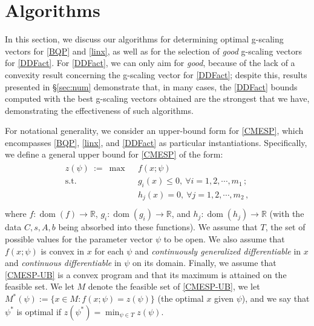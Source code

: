 \documentclass[smallextended]{svjour3hack}       %
\newcommand{\jon}[1]{\noindent{\color{cyan}[Jon:]\ {#1}}}
\newcommand{\zc}[1]{\noindent{\color{red}[Zhongzhu:]\ {#1}}}
\DeclareMathOperator{\dom}{dom}
\begin{document}
\section{Algorithms}
In this section, we discuss our algorithms  for determining optimal g-scaling vectors for \ref{BQP} and \ref{linx}, as well as for the selection of \emph{good} g-scaling vectors for \ref{DDFact}.
For \ref{DDFact}, we can only aim for \emph{good}, because of the lack of a convexity result concerning the g-scaling vector for \ref{DDFact}; despite this, results presented in \S \ref{sec:num} demonstrate that, in many cases, the \ref{DDFact} bounds computed with the best g-scaling vectors obtained are the strongest that we have, demonstrating the effectiveness of such algorithms.

For notational generality, we consider an upper-bound form for \ref{CMESP}, which encompasses \ref{BQP}, \ref{linx}, and \ref{DDFact} as particular instantiations. Specifically, we define a general upper bound for \ref{CMESP} of the form:
\begin{align}\tag{CMESP-UB} \label{CMESP-UB}
    \begin{array}{rl}
         z(\psi)~:=~ \max ~& ~f(x; \psi) \\
         \text{s.t.} ~& ~ g_i(x) \le 0, ~ \forall i = 1, 2, \cdots, m_1\,;\\
         &~ h_j(x) = 0, ~ \forall j = 1, 2, \cdots, m_2\,,\\
    \end{array}
\end{align}
where  $f: \dom(f) \rightarrow \mathbb{R}$,
$g_i:\dom(g_i) \rightarrow \mathbb{R}$, and $h_j:\dom(h_j)\rightarrow \mathbb{R}$ (with the data  $C,s, A, b$ being absorbed into these functions). We assume that $T$, the set of possible values for the parameter vector $\psi$ to be open. We also assume that $f(x;\psi)$ is convex in $x$ for each $\psi$ and \textit{continuously generalized differentiable} in $x$ and \textit{continuous differentiable} in $\psi$ on its domain. Finally, we assume that \ref{CMESP-UB} is a convex program and that its maximum is attained on the feasible set.
We let $M$ denote the feasible set of \ref{CMESP-UB}, we let $M^*(\psi):=\{x\in M : f(x;\psi)= z(\psi)\}$ (the optimal $x$ given $\psi$), and we say that $\psi^*$ is optimal if $z(\psi^*) = \min_{\psi\in T} z(\psi)$.
\end{document}
